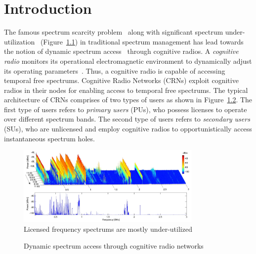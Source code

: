 \chapter{Introduction}\label{intro}
The famous spectrum scarcity problem~\cite{SpectrumScarcity} along with significant spectrum under-utilization~\cite{valenta2010survey} (Figure~\ref{fig:SpectrumUnderutilization}) in traditional spectrum management has lead towards the notion of dynamic spectrum access~\cite{akyildiz2006next} through cognitive radios. A \textit{cognitive radio} monitors its operational electromagnetic environment to dynamically adjust its operating parameters~\cite{Mitola}. Thus, a cognitive radio is capable of accessing temporal free spectrums. Cognitive Radio Networks (CRNs) exploit cognitive radios in their nodes for enabling access to temporal free spectrums. The typical architecture of CRNs comprises of two types of users as shown in Figure~\ref{fig:crn}. The first type of users refers to \textit{primary users} (PUs), who possess licenses to operate over different spectrum bands. The second type of users refers to \textit{secondary users} (SUs), who are unlicensed and employ cognitive radios to opportunistically access instantaneous spectrum holes.


\begin{figure}[!htbp]
    \begin{center}
        \includegraphics[width=0.8\textwidth]{myFigures/SpectrumUnderutilizationSir.PNG}
        \caption{Licensed frequency spectrums are mostly under-utilized~\cite{valenta2010survey}}
        \label{fig:SpectrumUnderutilization}
    \end{center}
\end{figure}

\begin{figure}[!htbp]
    \begin{center}
        
        \caption{Dynamic spectrum access through cognitive radio networks}
        \label{fig:crn}
    \end{center}
\end{figure}

